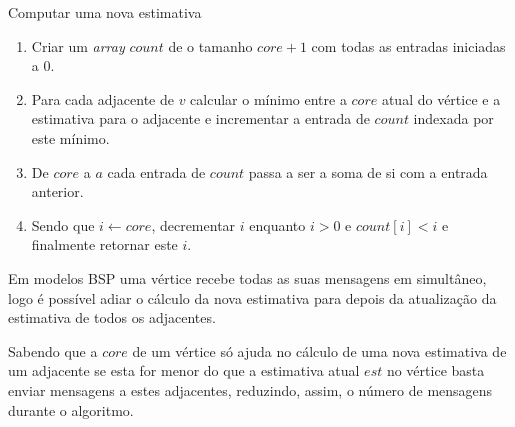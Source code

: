 \begin{algorithm}
\caption{Computar uma nova estimativa}

\begin{enumerate}
	\item Criar um \textit{array} $count$ de o tamanho $core+1$ com todas as entradas iniciadas a $0$.
	\item Para cada adjacente de $v$ calcular o mínimo entre a $core$ atual do vértice e a estimativa para o adjacente e incrementar a entrada de $count$ indexada por este mínimo.
	\item De $core$ a $a$ cada entrada de $count$ passa a ser a soma de si com a entrada anterior.
	\item Sendo que $i \gets core$, decrementar $i$ enquanto $i > 0$ e $count[i] < i$ e finalmente retornar este $i$.
\end{enumerate}
\end{algorithm}
Em modelos BSP uma vértice recebe todas as suas mensagens em simultâneo, logo é possível adiar o cálculo da nova estimativa para depois da atualização da estimativa de todos os adjacentes. 

Sabendo que a $core$ de um vértice só ajuda no cálculo de uma nova estimativa de um adjacente se esta for menor do que a estimativa atual $est$ no vértice basta enviar mensagens a estes adjacentes, reduzindo, assim, o número de mensagens durante o algoritmo.







